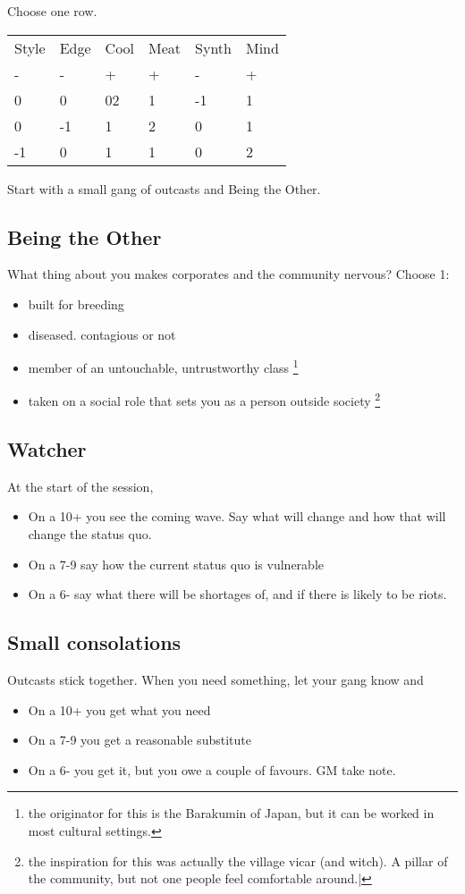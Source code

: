 \documentclass{tufte-book}
\begin{document}
Choose one row.
\begin{table}[ht]
\centering
{}\selectfont
\begin{tabular}{llllll}
\toprule
Style 	& Edge & Cool & Meat & Synth & Mind\\
- 	&- 	&+ 	&	+&	-&	+\\
\midrule
0&0&02&1&-1&1\\
0&-1&1&2&0&1\\
-1&0&1&1&0&2\\
\bottomrule
\end{tabular}
\end{table}

Start with a small gang of outcasts and Being the Other.

\subsection{Being the Other}
What thing about you makes corporates and the community nervous?
Choose 1:
\begin{itemize}
\item built for breeding
\item diseased. contagious or not
\item member of an untouchable, untrustworthy class \footnote{the originator for this is the Barakumin of Japan, but it can be worked in most cultural settings.}
\item taken on a social role that sets you as a person outside society \footnote {the inspiration for this was actually the village vicar (and witch). A pillar of the community, but not one people feel comfortable around.|}
\end{itemize}


\subsection{Watcher}
At the start of the session, 
\begin{itemize}
\item On a 10+ you see the coming wave. Say what will change and how that will change the status quo.
\item On a 7-9 say how the current status quo is vulnerable
\item On a 6- say what there will be shortages of, and if there is likely to be riots.
\end{itemize}

\subsection{Small consolations}
Outcasts stick together. When you need something, let your gang know and 
\begin{itemize}
\item On a 10+ you get what you need
\item On a 7-9 you get a reasonable substitute
\item On a 6- you get it, but you owe a couple of favours. GM take note.
\end{itemize}
\end{document}
